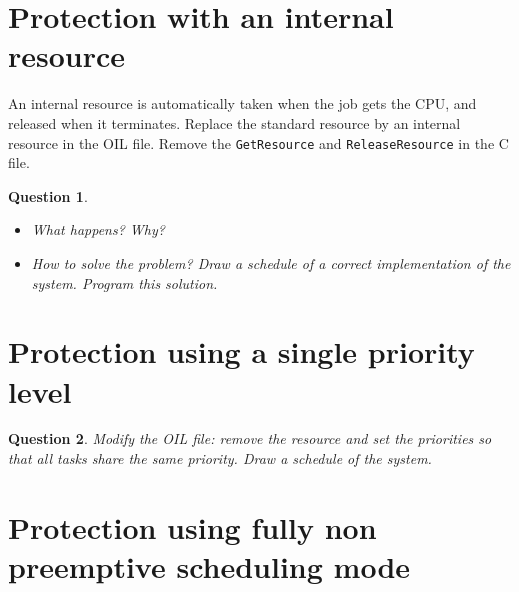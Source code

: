 \documentclass[11pt]{report}
\newtheorem{ex}{Question}
\begin{document}




\section{Protection with an internal resource}

An internal resource is automatically taken when the job gets the CPU, and released when it terminates. Replace the standard resource by an internal resource in the OIL file. Remove the \texttt{GetResource} and \texttt{ReleaseResource} in the C file.

\begin{ex}~
    \begin{itemize}
        \item
            What happens? Why?
        \item
            How to solve the problem? Draw a schedule of a correct implementation of the system. Program this solution.
    \end{itemize}
\end{ex}


\section{Protection using a single priority level}

\begin{ex}
Modify the OIL file: remove the resource and set the priorities so that all tasks share the same priority. Draw a schedule of the system.
\end{ex}

\section{Protection using fully non preemptive scheduling mode}
\end{document}
